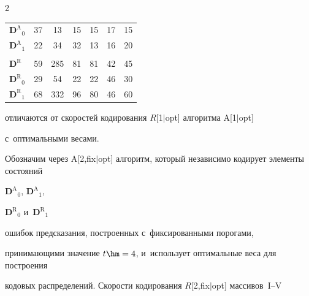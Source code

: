 \begin{multicols}{2}
\begin{center}
{\begin{tabular}{|l|ccccc|c|}
\hspace*{3mm}${\mathbf{D}^\text{A}}_0$     &37 &13 &15 &15 &17&15\\

\hspace*{3mm}${\mathbf{D}^\text{A}}_1$     &22 &34 &32 &13 &16 &20\\  

\hline

&&&&&&\\[-9pt]

\hspace*{3mm}$\mathbf{D}^\text{R}$      &59 &285    &81 &81 &42 &45  \\

\hspace*{3mm}${\mathbf{D}^\text{R}}_0$    &29 &\hphantom{1}54 &22 &22 &46 &30  \\

\hspace*{3mm}${\mathbf{D}^\text{R}}_1$    &68 &332    &96 &80 &46 &60  \\

\hline

\end{tabular}

}

\end{center}






\vspace*{9pt}





\noindent

 отличаются от скоростей кодирования $R$[1$\vert$opt] алгоритма A[1$\vert$opt] 

с~оптимальными весами.



Обозначим через A[2,fix$\vert$opt] алгоритм, который независимо кодирует элементы состояний

${\mathbf{D}^\text{A}}_0$, ${\mathbf{D}^\text{A}}_1$,

${\mathbf{D}^\text{R}}_0$ и~${\mathbf{D}^\text{R}}_1$

ошибок предсказания, построенных с~фиксированными порогами,  

принимающими значение $t\hm=4$, и~использует оптимальные веса для построения 

кодовых распределений. Скорости кодирования $R$[2,fix$\vert$opt] массивов~I--V 


\end{multicols}
